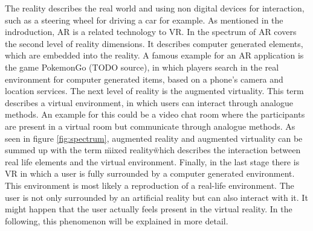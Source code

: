 The reality describes the real world and using non digital devices for interaction, such as a steering wheel for driving a car for example. As mentioned in the indroduction, AR is a related technology to VR. In the spectrum of \cite{Tham.2018} AR covers the second level of reality dimensions. It describes computer generated elements, which are embedded into the reality. A famous example for an AR application is the game PokemonGo (TODO source), in which players search in the real environment for computer generated items, based on a phone's camera and location services. The next level of reality is the augmented virtuality. This term describes a virtual environment, in which users can interact through analogue methods. An example for this could be a video chat room where the participants are present in a virtual room but communicate through analogue methods. As seen in figure \ref{fig:spectrum}, augmented reality and augmented virtuality can be summed up with the term \"mixed reality\" which describes the interaction between real life elements and the virtual environment. Finally, in the last stage there is VR in which a user is fully surrounded by a computer generated environment. This environment is most likely a reproduction of a real-life environment. The user is not only surrounded by an artificial reality but can also interact with it. It might happen that the user actually feels present in the virtual reality. In the following, this phenomenon will be explained in more detail.

